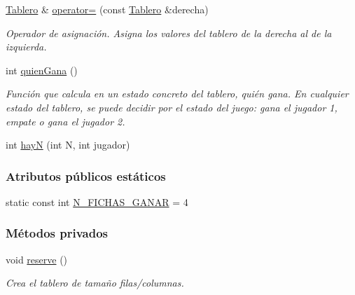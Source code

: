 \begin{DoxyCompactItemize}
\hyperlink{classTablero}{Tablero} \& \hyperlink{classTablero_abd7c6bb5bc26c0500308848399e1fd4f}{operator=} (const \hyperlink{classTablero}{Tablero} \&derecha)
\begin{DoxyCompactList}\small\item\em Operador de asignación. Asigna los valores del tablero de la derecha al de la izquierda. \end{DoxyCompactList}\item 
int \hyperlink{classTablero_a5de543f8186142731ab3ac77944a11b1}{quien\-Gana} ()
\begin{DoxyCompactList}\small\item\em Función que calcula en un estado concreto del tablero, quién gana. En cualquier estado del tablero, se puede decidir por el estado del juego\-: gana el jugador 1, empate o gana el jugador 2. \end{DoxyCompactList}\item 
int \hyperlink{classTablero_ab37908ce43a8f0affd4842fcfa3ceb22}{hay\-N} (int N, int jugador)
\end{DoxyCompactItemize}
\subsubsection*{Atributos públicos estáticos}
\begin{DoxyCompactItemize}
\item 
static const int \hyperlink{classTablero_aa38ed353bef45bd6c5a2e3aa4a897720}{N\-\_\-\-F\-I\-C\-H\-A\-S\-\_\-\-G\-A\-N\-A\-R} = 4
\end{DoxyCompactItemize}
\subsubsection*{Métodos privados}
\begin{DoxyCompactItemize}
\item 
void \hyperlink{classTablero_ac2a20883f540c4d010dafab236390cb3}{reserve} ()
\begin{DoxyCompactList}\small\item\em Crea el tablero de tamaño filas/columnas. \end{DoxyCompactList}\end{DoxyCompactItemize}

